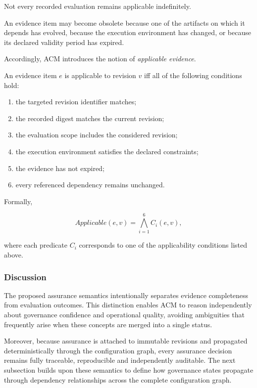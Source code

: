 \documentclass[10pt]{article}
\begin{document}
Not every recorded evaluation remains applicable indefinitely.

An evidence item may become obsolete because one of the artifacts on which it
depends has evolved, because the execution environment has changed, or because
its declared validity period has expired.

Accordingly, ACM introduces the notion of
\emph{applicable evidence}.

An evidence item
\(e\)
is applicable to revision
\(v\)
iff all of the following conditions hold:

\begin{enumerate}
    \item the targeted revision identifier matches;
    \item the recorded digest matches the current revision;
    \item the evaluation scope includes the considered revision;
    \item the execution environment satisfies the declared constraints;
    \item the evidence has not expired;
    \item every referenced dependency remains unchanged.
\end{enumerate}

Formally,

\begin{equation}
Applicable(e,v)
=
\bigwedge_{i=1}^{6}
C_i(e,v),
\label{eq:applicable_evidence}
\end{equation}

where each predicate
\(C_i\)
corresponds to one of the applicability conditions listed above.

\subsubsection{Discussion}

The proposed assurance semantics intentionally separates evidence completeness
from evaluation outcomes. This distinction enables ACM to reason independently
about governance confidence and operational quality, avoiding ambiguities that
frequently arise when these concepts are merged into a single status.

Moreover, because assurance is attached to immutable revisions and propagated
deterministically through the configuration graph, every assurance decision
remains fully traceable, reproducible and independently auditable. The next
subsection builds upon these semantics to define how governance states
propagate through dependency relationships across the complete configuration
graph.
\end{document}
